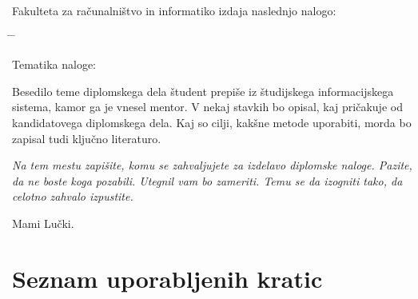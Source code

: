 \documentclass[a4paper, 12pt]{book}
\newcommand{\clearemptydoublepage}{\newpage{\pagestyle{empty}\cleardoublepage}}
\begin{document}
\noindent
Fakulteta za računalništvo in informatiko izdaja naslednjo nalogo:
\medskip
\begin{tabbing}
\hspace{32mm}\= \hspace{6cm} \= \kill




Tematika naloge:
\end{tabbing}
Besedilo teme diplomskega dela študent prepiše iz študijskega informacijskega sistema, kamor ga je vnesel mentor. V nekaj stavkih bo opisal, kaj pričakuje od kandidatovega diplomskega dela. Kaj so cilji, kakšne metode uporabiti, morda bo zapisal tudi ključno literaturo.
\vspace{15mm}






\vspace{2cm}

\clearemptydoublepage

\thispagestyle{empty}\mbox{}\vfill\null\it%
\noindent
Na tem mestu zapišite, komu se zahvaljujete za izdelavo diplomske naloge. Pazite, da ne boste koga pozabili. Utegnil vam bo zameriti. Temu se da izogniti tako, da celotno zahvalo izpustite.
\rm\normalfont

\clearemptydoublepage

\thispagestyle{empty}\mbox{}{\textheight}\mbox{}\hfill\begin{minipage}{0.55\textwidth}%
Mami Lučki.
\normalfont\end{minipage}

\clearemptydoublepage


\pagestyle{empty}
\def\thepage{}%
\tableofcontents{}


\clearemptydoublepage


\chapter*{Seznam uporabljenih kratic}  %
\end{document}
